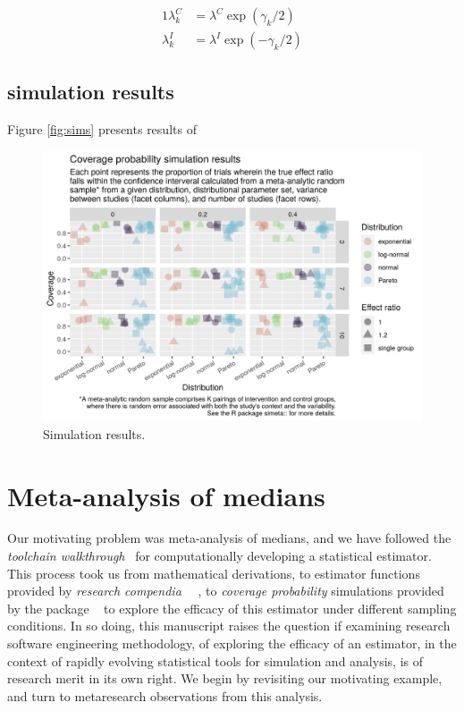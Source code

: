 \documentclass{article}
\begin{document}
\begin{alignat*}{1}
 \lambda_k^C & = \lambda^C  \exp(\gamma_k/2)\\
 \lambda_k^I & = \lambda^I  \exp(-\gamma_k/2)
\end{alignat*}


\subsection{simulation results}


Figure \ref{fig:sims} presents results of

\begin{figure}
   \includegraphics[width=\textwidth]{coverage.png}
   \caption{Simulation results.}
\end{figure}




\section{Meta-analysis of medians}

Our motivating problem was meta-analysis of medians, and we have followed the \emph{toolchain walkthrough}~\cite{gray2019textttcodeproof} for computationally developing a statistical estimator. This process took us from mathematical derivations, to estimator functions provided by \emph{research compendia}~\cite{grayTruthProofReproducibility2019} ~\cite{grayVarametaEstimatorsVariance2020}, to \emph{coverage probability} simulations provided by the package ~\cite{graySimetaSimulateMetaanalysis2020} to explore the efficacy of this estimator under different sampling conditions. In so doing, this manuscript raises the question if examining research software engineering methodology, of exploring the efficacy of an estimator, in the context of rapidly evolving statistical tools for simulation and analysis, is of research merit in its own right. We begin by revisiting our motivating example, and turn to metaresearch observations from this analysis.
\end{document}
